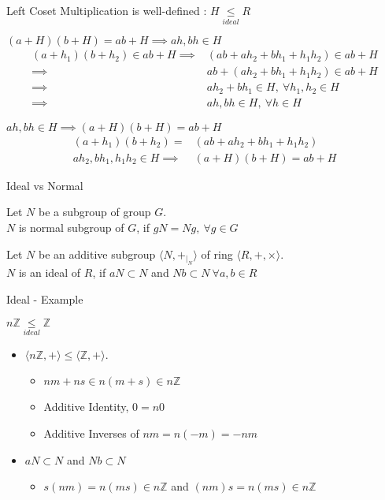 \documentclass{beamer}
\newcommand{\subgroup}{\le}
\newcommand{\subring}{\le}
\begin{document}
\begin{frame}{Left Coset Multiplication is well-defined : $H \underset{ideal}{\subring} R$}
\begin{block}{$(a+H)(b+H) = ab+H \implies ah,bh \in H$}
\begin{align*}
	(a+h_1)(b+h_2) \in ab+H \implies & (ab + ah_2 + bh_1 + h_1h_2) \in ab+H \\
	\implies & ab + (ah_2+bh_1+h_1h_2) \in ab + H \\
	\implies & ah_2+bh_1 \in H,\ \forall h_1,h_2 \in H \\
	\implies & ah,bh \in H,\ \forall h \in H
\end{align*}
\end{block}
\begin{block}{$ah,bh \in H \implies (a+H)(b+H)=ab+H$}
\begin{align*}
	(a+h_1)(b+h_2) =&  (ab + ah_2 + bh_1 + h_1h_2) \\
	ah_2,bh_1,h_1h_2 \in H \implies & (a+H)(b+H) = ab + H
\end{align*}
\end{block}
\end{frame}

\begin{frame}{Ideal vs Normal}
\begin{definition}
	Let $N$ be a subgroup of group $G$.\\
	$N$ is normal subgroup of $G$, if $gN = Ng,\ \forall g \in G$
\end{definition}

\begin{definition}[Ideal]
	Let $N$ be an additive subgroup $\langle N,+_{|_N} \rangle$ of ring $\langle R,+,\times \rangle$.\\
	$N$ is an ideal of $R$, if $aN \subset N$ and $Nb \subset N\ \forall a,b \in R$
\end{definition}
\end{frame}

\begin{frame}{Ideal - Example}
\begin{exampleblock}{$n\mathbb{Z} \underset{ideal}{\subgroup} \mathbb{Z}$}
\begin{itemize}
	\item $\langle n\mathbb{Z},+ \rangle \subgroup \langle \mathbb{Z},+ \rangle$.
	\begin{itemize}
		\item $nm + ns \in n(m+s) \in n\mathbb{Z}$
		\item Additive Identity, $0 = n0$
		\item Additive Inverses of $nm = n(-m) = -nm$
	\end{itemize}
	\item $aN \subset N$ and $Nb \subset N$
	\begin{itemize}
		\item $s(nm) = n(ms) \in n\mathbb{Z}$ and $(nm)s = n(ms) \in n\mathbb{Z}$
	\end{itemize}
\end{itemize}
\end{exampleblock}
\end{frame}
\end{document}
